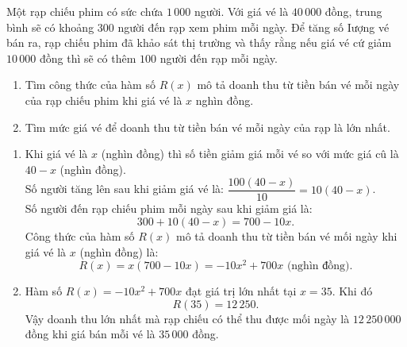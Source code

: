 \begin{bt}%
	Một rạp chiếu phim có sức chứa $1\,000$ người. Với giá vé là $40\,000$ đồng, trung bình sẽ có khoảng $300$ người đến rạp xem phim mỗi ngày. Để tăng số Iượng vé bán ra, rạp chiếu phim đã khảo sát thị trường và thấy rằng nếu giá vé cứ giảm $10\,000$ đồng thì sẽ có thêm $100$ người đến rạp mỗi ngày.
	\begin{enumerate}
		\item Tìm công thức của hàm số $R(x)$ mô tả doanh thu từ tiền bán vé mỗi ngày của rạp chiếu phim khi giá vé là $x$ nghìn đồng.
		\item Tìm mức giá vé để doanh thu từ tiền bán vé mỗi ngày của rạp là lớn nhất.
	\end{enumerate}
	\loigiai
	{
		\begin{enumerate}
			\item Khi giá vé là $x$ (nghìn đồng) thì số tiền giảm giá mỗi vé so với mức giá cû là $40-x$ (nghìn đồng).\\
			Số người tăng lên sau khi giảm giá vé là: $\dfrac{100(40-x)}{10}=10(40-x)$.\\
			Số người đến rạp chiếu phim mỗi ngày sau khi giảm giá là:
			\[300+10(40-x)=700-10 x.\]
			Công thức của hàm số $R(x)$ mô tả doanh thu từ tiền bán vé mối ngày khi giá vé là $x$ (nghìn đồng) là:
			\[R(x)=x(700-10 x)=-10 x^2+700 x \text{ (nghìn đồng)}.\]
			\item Hàm số $R(x)=-10 x^2+700 x$ đạt giá trị lớn nhất tại $x=35$. Khi đó
			\[R(35)=12\,250.\]
			Vậy doanh thu lớn nhất mà rạp chiếu có thể thu được mối ngày là $12\,250\,000$ đồng khi giá bán mỗi vé là $35\,000$ đồng.
		\end{enumerate}
	}
\end{bt}

